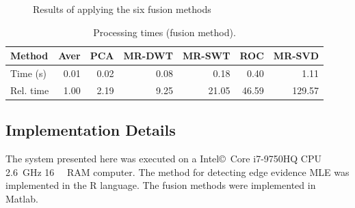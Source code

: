 \documentclass[journal]{IEEEtran}
\begin{document}
\begin{figure}[hbt]
{     }
     \caption{Results of applying the six fusion methods}
     \label{fusion_met}
\end{figure}

\begin{table}[hbt]
	\centering
	\caption{Processing times (fusion method).}\label{metrica_de_tempo}
	\begin{tabular}{@{}lrrrrrr@{}} \toprule
		Method       & Aver   &   PCA      &  MR-DWT  & MR-SWT &  ROC  &  MR-SVD \\ \midrule
		Time (s)      & 0.01      & 0.02       &  0.08 & 0.18      &  0.40       & 1.11  \\
		Rel. time     & 1.00      & 2.19       &  9.25 & 21.05     &  46.59      & 129.57  \\ \bottomrule
	\end{tabular}
\end{table}

\subsection{Implementation Details}

The system presented here was executed on a Intel\copyright\ Core i7-9750HQ CPU \SI{2.6}{\giga\hertz} \SI{16}{\giga\byte} RAM computer.  
The method for detecting edge evidence MLE was implemented in the R language.
The fusion methods were implemented in Matlab. 
\end{document}
